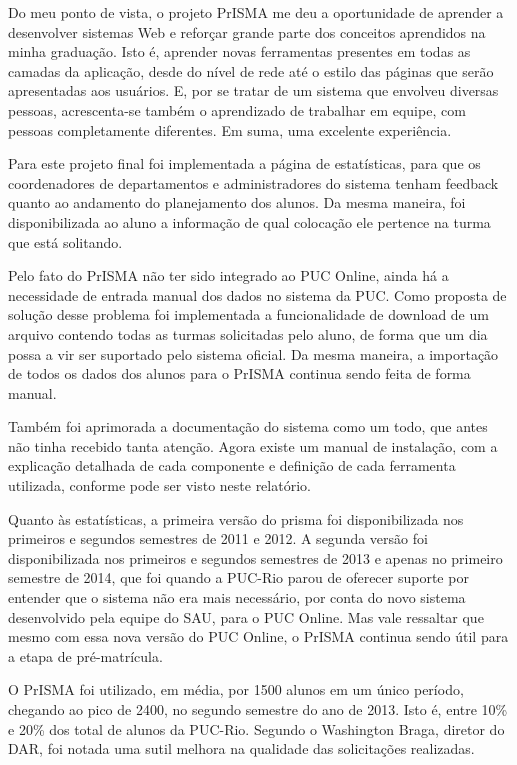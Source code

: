\documentclass[graduacao,brazil]{ThesisPUC}
\begin{document}
Do meu ponto de vista, o projeto PrISMA me deu a oportunidade de aprender a desenvolver sistemas Web e reforçar grande parte dos conceitos aprendidos na minha graduação. Isto é, aprender novas ferramentas presentes em todas as camadas da aplicação, desde do nível de rede até o estilo das páginas que serão apresentadas aos usuários. E, por se tratar de um sistema que envolveu diversas pessoas, acrescenta-se também o aprendizado de trabalhar em equipe, com pessoas completamente diferentes. Em suma, uma excelente experiência.

Para este projeto final foi implementada a página de estatísticas, para que os coordenadores de departamentos e administradores do sistema tenham feedback quanto ao andamento do planejamento dos alunos. Da mesma maneira, foi disponibilizada ao aluno a informação de qual colocação ele pertence na turma que está solitando.

Pelo fato do PrISMA não ter sido integrado ao PUC Online, ainda há a necessidade de entrada manual dos dados no sistema da PUC. Como proposta de solução desse problema foi implementada a funcionalidade de download de um arquivo contendo todas as turmas solicitadas pelo aluno, de forma que um dia possa a vir ser suportado pelo sistema oficial. Da mesma maneira, a importação de todos os dados dos alunos para o PrISMA continua sendo feita de forma manual.

Também foi aprimorada a documentação do sistema como um todo, que antes não tinha recebido tanta atenção. Agora existe um manual de instalação, com a explicação detalhada de cada componente e definição de cada ferramenta utilizada, conforme pode ser visto neste relatório.

Quanto às estatísticas, a primeira versão do prisma foi disponibilizada nos primeiros e segundos semestres de 2011 e 2012. A segunda versão foi disponibilizada nos primeiros e segundos semestres de 2013 e apenas no primeiro semestre de 2014, que foi quando a PUC-Rio parou de oferecer suporte por entender que o sistema não era mais necessário, por conta do novo sistema desenvolvido pela equipe do SAU, para o PUC Online. Mas vale ressaltar que mesmo com essa nova versão do PUC Online, o PrISMA continua sendo útil para a etapa de pré-matrícula.

O PrISMA foi utilizado, em média, por 1500 alunos em um único período, chegando ao pico de 2400, no segundo semestre do ano de 2013. Isto é, entre 10\% e 20\% dos total de alunos da PUC-Rio. Segundo o Washington Braga, diretor do DAR, foi notada uma sutil melhora na qualidade das solicitações realizadas.
\end{document}
